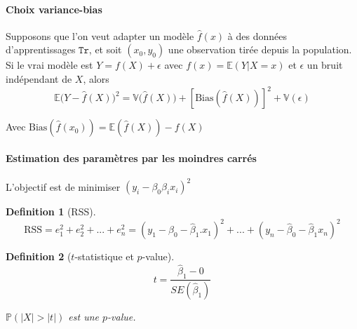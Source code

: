 \documentclass{article}
\newtheorem{defi}{Definition}
\begin{document}
\paragraph{Choix variance-bias} Supposons que l'on veut adapter un modèle $\hat{f}(x)$ à des données d'apprentissages $\mathtt{Tr}$, et soit $(x_0, y_0)$ une observation tirée depuis la population. Si le vrai modèle est $Y= f(X) + \epsilon$ avec $f(x)=\mathbb{E}(Y|X=x)$ et $\epsilon$ un bruit indépendant de $X$, alors
\[\mathbb{E}\Big(Y - \hat{f}(X)\Big)^2 = \mathbb{V}\big(\hat{f}(X)\big) + [\text{Bias}(\hat{f}(X))]^2 + \mathbb{V}(\epsilon)\]

Avec $\text{Bias}(\hat{f}(x_0))=\mathbb{E}(\hat{f}(X))-f(X)$

\paragraph{Estimation des paramètres par les moindres carrés}
L'objectif est de minimiser $(y_i - \beta_0 \beta_i x_i)^2$

\begin{defi}[RSS]
\[\text{RSS} = e_1^2 + e_2^2 + ... + e_n^2 = (y_1 - \hat{\beta}_0 - \hat{\beta}_1.x_1)^2 + ... + (y_n - \hat{\beta}_0 - \hat{\beta}_1 x_n)^2\]
\end{defi}

\begin{defi}[$t$-statistique et $p$-value]
\[t=\dfrac{\hat{\beta}_1 - 0}{SE(\hat{\beta}_1)}\]

$\mathbb{P}(|X|>|t|)$ est une $p$-value.
\end{defi}

\end{document}
